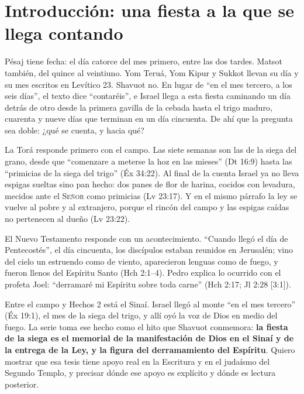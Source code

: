 \documentclass[11pt,letterpaper]{article}
\newcommand{\SENOR}{\textsc{Señor}}
\newcommand{\destacar}[1]{\textbf{\textcolor{tierraroja}{#1}}}
\begin{document}
\section{Introducción: una fiesta a la que se llega contando}

Pésaj tiene fecha: el día catorce del mes primero, entre las dos tardes. Matsot también, del quince al veintiuno. Yom Teruá, Yom Kipur y Sukkot llevan su día y su mes escritos en Levítico 23. Shavuot no. En lugar de ``en el mes tercero, a los seis días'', el texto dice ``contaréis'', e Israel llega a esta fiesta caminando un día detrás de otro desde la primera gavilla de la cebada hasta el trigo maduro, cuarenta y nueve días que terminan en un día cincuenta. De ahí que la pregunta sea doble: ¿qué se cuenta, y hacia qué?

La Torá responde primero con el campo. Las siete semanas son las de la siega del grano, desde que ``comenzare a meterse la hoz en las mieses'' (Dt 16:9) hasta las ``primicias de la siega del trigo'' (Éx 34:22). Al final de la cuenta Israel ya no lleva espigas sueltas sino pan hecho: dos panes de flor de harina, cocidos con levadura, mecidos ante el \SENOR{} como primicias (Lv 23:17). Y en el mismo párrafo la ley se vuelve al pobre y al extranjero, porque el rincón del campo y las espigas caídas no pertenecen al dueño (Lv 23:22).

El Nuevo Testamento responde con un acontecimiento. ``Cuando llegó el día de Pentecostés'', el día cincuenta, los discípulos estaban reunidos en Jerusalén; vino del cielo un estruendo como de viento, aparecieron lenguas como de fuego, y fueron llenos del Espíritu Santo (Hch 2:1--4). Pedro explica lo ocurrido con el profeta Joel: ``derramaré mi Espíritu sobre toda carne'' (Hch 2:17; Jl 2:28 [3:1]).

Entre el campo y Hechos 2 está el Sinaí. Israel llegó al monte ``en el mes tercero'' (Éx 19:1), el mes de la siega del trigo, y allí oyó la voz de Dios en medio del fuego. La serie toma ese hecho como el hito que Shavuot conmemora: \destacar{la fiesta de la siega es el memorial de la manifestación de Dios en el Sinaí y de la entrega de la Ley, y la figura del derramamiento del Espíritu}. Quiero mostrar que esa tesis tiene apoyo real en la Escritura y en el judaísmo del Segundo Templo, y precisar dónde ese apoyo es explícito y dónde es lectura posterior.
\end{document}
